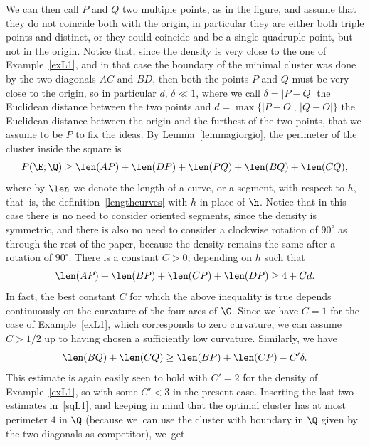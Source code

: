 \begin{example}
We can then call $P$ and $Q$ two multiple points, as in the figure, and assume that they do not coincide both with the origin, in particular they are either both triple points and distinct, or they could coincide and be a single quadruple point, but not in the origin. Notice that, since the density is very close to the one of Example~\ref{exL1}, and in that case the boundary of the minimal cluster was done by the two diagonals $AC$ and $BD$, then both the points $P$ and $Q$ must be very close to the origin, so in particular $d,\,\delta \ll 1$, where we call $\delta=|P-Q|$ the Euclidean distance between the two points and $d=\max\{|P-O|,\, |Q-O|\}$ the Euclidean distance between the origin and the furthest of the two points, that we assume to be $P$ to fix the ideas. By Lemma~\ref{lemmagiorgio}, the perimeter of the cluster inside the square is\vspace*{-3pt}
\begin{equation}\label{sqL1}
P(\E; \Q)\geq \len(AP)+\len(DP)+\len(PQ)+\len(BQ)+\len(CQ),
\end{equation}
where by $\len$ we denote the length of a curve, or a segment, with respect to $h$, that~is, the definition~\eqref{lengthcurves} with $h$ in place of $\h$. Notice that in this case there is no need to consider oriented segments, since the density is symmetric, and there is also no need to consider a clockwise rotation of $90^\circ$ as through the rest of the paper, because the density remains the same after a rotation of $90^\circ$. There is a constant $C>0$, depending on $h$ such that\vspace*{-3pt}
\[
\len(AP)+\len(BP)+\len(CP)+\len(DP) \geq 4 + C d.
\]
In fact, the best constant $C$ for which the above inequality is true depends continuously on the curvature of the four arcs of $\C$. Since we have $C=1$ for the case of Example~\ref{exL1}, which corresponds to zero curvature, we can assume $C>1/2$ up to having chosen a sufficiently low curvature. Similarly, we have\vspace*{-3pt}
\[
\len(BQ)+\len(CQ) \geq \len (BP)+\len(CP) - C' \delta.
\]
This estimate is again easily seen to hold with $C'=2$ for the density of Example~\ref{exL1}, so with some $C'<3$ in the present case. Inserting the last two estimates in~\eqref{sqL1}, and keeping in mind that the optimal cluster has at most perimeter $4$ in $\Q$ (because we~can use the cluster with boundary in $\Q$ given by the two diagonals as competitor), we~get\vspace*{-3pt}
\begin{equation}\label{eL2}

\end{equation}
\end{example}
